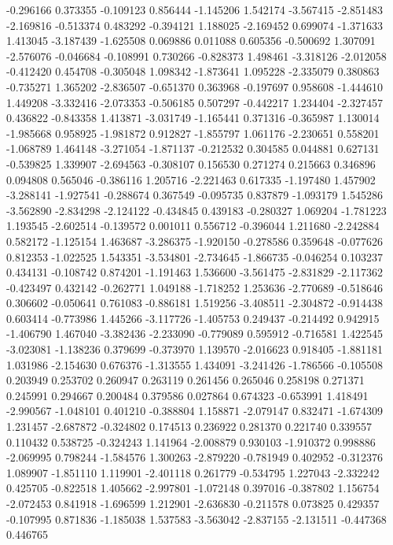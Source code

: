 -0.296166
0.373355
-0.109123
0.856444
-1.145206
1.542174
-3.567415
-2.851483
-2.169816
-0.513374
0.483292
-0.394121
1.188025
-2.169452
0.699074
-1.371633
1.413045
-3.187439
-1.625508
0.069886
0.011088
0.605356
-0.500692
1.307091
-2.576076
-0.046684
-0.108991
0.730266
-0.828373
1.498461
-3.318126
-2.012058
-0.412420
0.454708
-0.305048
1.098342
-1.873641
1.095228
-2.335079
0.380863
-0.735271
1.365202
-2.836507
-0.651370
0.363968
-0.197697
0.958608
-1.444610
1.449208
-3.332416
-2.073353
-0.506185
0.507297
-0.442217
1.234404
-2.327457
0.436822
-0.843358
1.413871
-3.031749
-1.165441
0.371316
-0.365987
1.130014
-1.985668
0.958925
-1.981872
0.912827
-1.855797
1.061176
-2.230651
0.558201
-1.068789
1.464148
-3.271054
-1.871137
-0.212532
0.304585
0.044881
0.627131
-0.539825
1.339907
-2.694563
-0.308107
0.156530
0.271274
0.215663
0.346896
0.094808
0.565046
-0.386116
1.205716
-2.221463
0.617335
-1.197480
1.457902
-3.288141
-1.927541
-0.288674
0.367549
-0.095735
0.837879
-1.093179
1.545286
-3.562890
-2.834298
-2.124122
-0.434845
0.439183
-0.280327
1.069204
-1.781223
1.193545
-2.602514
-0.139572
0.001011
0.556712
-0.396044
1.211680
-2.242884
0.582172
-1.125154
1.463687
-3.286375
-1.920150
-0.278586
0.359648
-0.077626
0.812353
-1.022525
1.543351
-3.534801
-2.734645
-1.866735
-0.046254
0.103237
0.434131
-0.108742
0.874201
-1.191463
1.536600
-3.561475
-2.831829
-2.117362
-0.423497
0.432142
-0.262771
1.049188
-1.718252
1.253636
-2.770689
-0.518646
0.306602
-0.050641
0.761083
-0.886181
1.519256
-3.408511
-2.304872
-0.914438
0.603414
-0.773986
1.445266
-3.117726
-1.405753
0.249437
-0.214492
0.942915
-1.406790
1.467040
-3.382436
-2.233090
-0.779089
0.595912
-0.716581
1.422545
-3.023081
-1.138236
0.379699
-0.373970
1.139570
-2.016623
0.918405
-1.881181
1.031986
-2.154630
0.676376
-1.313555
1.434091
-3.241426
-1.786566
-0.105508
0.203949
0.253702
0.260947
0.263119
0.261456
0.265046
0.258198
0.271371
0.245991
0.294667
0.200484
0.379586
0.027864
0.674323
-0.653991
1.418491
-2.990567
-1.048101
0.401210
-0.388804
1.158871
-2.079147
0.832471
-1.674309
1.231457
-2.687872
-0.324802
0.174513
0.236922
0.281370
0.221740
0.339557
0.110432
0.538725
-0.324243
1.141964
-2.008879
0.930103
-1.910372
0.998886
-2.069995
0.798244
-1.584576
1.300263
-2.879220
-0.781949
0.402952
-0.312376
1.089907
-1.851110
1.119901
-2.401118
0.261779
-0.534795
1.227043
-2.332242
0.425705
-0.822518
1.405662
-2.997801
-1.072148
0.397016
-0.387802
1.156754
-2.072453
0.841918
-1.696599
1.212901
-2.636830
-0.211578
0.073825
0.429357
-0.107995
0.871836
-1.185038
1.537583
-3.563042
-2.837155
-2.131511
-0.447368
0.446765
